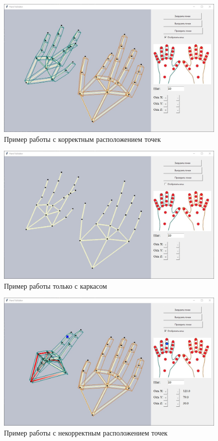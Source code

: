 \begin{figure}[ht!]
	\centering
	\includegraphics[scale=0.5]{example1.jpg}
	\caption{Пример работы с корректным расположением точек}
	\label{fig:example1}
\end{figure}

\begin{figure}[ht!]
	\centering
	\includegraphics[scale=0.5]{example2.jpg}
	\caption{Пример работы только с каркасом}
	\label{fig:example2}
\end{figure}

\begin{figure}[ht!]
	\centering
	\includegraphics[scale=0.5]{example3.jpg}
	\caption{Пример работы с некорректным расположением точек}
	\label{fig:example3}
\end{figure}



